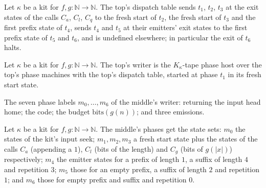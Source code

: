 \begin{definition}
\label{Turing.NTimeDiag.qyTopRed}
\leanok
{}
Let $\kappa$ be a kit for $f, g : \mathbb{N} \to \mathbb{N}$. The top's dispatch table sends $t_1$,
$t_2$, $t_3$ at the exit states of the calls $C_a$, $C_l$, $C_q$ to the fresh start of $t_2$, the
fresh start of $t_3$ and the first prefix state of $t_4$, sends $t_4$ and $t_5$ at their emitters'
exit states to the first prefix state of $t_5$ and $t_6$, and is undefined elsewhere; in
particular the exit of $t_6$ halts.
\end{definition}

\begin{definition}
\label{Turing.NTimeDiag.qyTop}
\leanok
{}
Let $\kappa$ be a kit for $f, g : \mathbb{N} \to \mathbb{N}$. The top's writer is the
$K_\kappa$-tape phase host over the top's phase machines with the top's dispatch table, started at
phase $t_1$ in its fresh start state.
\end{definition}

\begin{definition}
\label{Turing.NTimeDiag.QyMK}
\leanok
The seven phase labels $m_0, \dots, m_6$ of the middle's writer: returning the input head home;
the code; the budget $\mathrm{bits}(g(n))$; and three emissions.
\end{definition}

\begin{definition}
\label{Turing.NTimeDiag.QyMPh}
\leanok
{}
Let $\kappa$ be a kit for $f, g : \mathbb{N} \to \mathbb{N}$. The middle's phases get the state
sets: $m_0$ the states of the kit's input seek; $m_1, m_2, m_3$ a fresh start state plus the
states of the calls $C_a$ (appending a $1$), $C_l$ (bits of the length) and $C_g$ (bits of
$g(|x|)$) respectively; $m_4$ the emitter states for a prefix of length $1$, a suffix of length $4$
and repetition $3$; $m_5$ those for an empty prefix, a suffix of length $2$ and repetition $1$; and
$m_6$ those for empty prefix and suffix and repetition $0$.
\end{definition}

